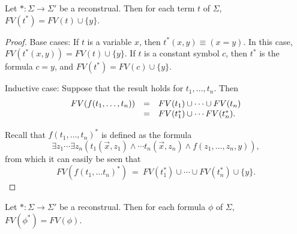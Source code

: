 \begin{lemma} Let $*:\Sigma\to\Sigma '$ be a reconstrual.  Then for
  each term $t$ of $\Sigma$, $FV(t^*)=FV(t)\cup \{ y\}$.  \end{lemma}

\begin{proof} Base cases: If $t$ is a variable $x$, then
  $t^*(x,y)\equiv (x=y)$.  In this case,
  $FV(t^*(x,y))=FV(t)\cup \{ y\}$.  If $t$ is a constant symbol $c$,
  then $t^*$ is the formula $c=y$, and $FV(t^*)=FV(c)\cup \{ y\}$.

  Inductive case: Suppose that the result holds for $t_1,\dots ,t_n$.
  Then
  \[ \begin{array}{l l l} FV(f(t_1,\dots ,t_n)) & = & FV(t_1)\cup
      \cdots \cup
                                                      FV(t_n) \\
                                                & = &
                                                      FV(t^*_1)\cup\cdots
                                                      FV(t^*_n)
                                                      .\end{array}
  \]

  Recall that $f(t_1,\dots ,t_n)^*$ is defined as the formula
  \[ \exists z_1\cdots \exists z_n \left( t_1(\vec{x},z_1)\wedge
      \cdots t_n(\vec{x},z_n)\wedge f(z_1,\dots ,z_n,y)\right) ,\]
  from which it can easily be seen that
  \[ FV(f(t_1,\dots t_n)^*) \: = \: FV(t_1^*)\cup\cdots \cup
    FV(t_n^*)\cup \{ y\}.\]
\end{proof}

\begin{lemma} Let $*:\Sigma\to\Sigma '$ be a reconstrual.  Then for
  each formula $\phi$ of $\Sigma$, $FV(\phi ^*)=FV(\phi
  )$. \label{same-var} \end{lemma}

